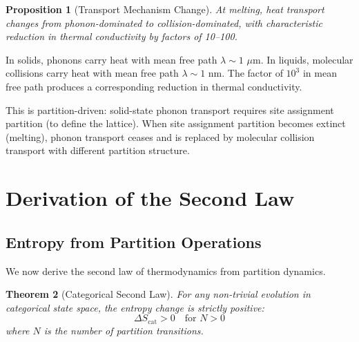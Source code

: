 \documentclass[twocolumn,10pt,aps,prd,superscriptaddress,nofootinbib]{revtex4-2}
\newtheorem{theorem}{Theorem}[section]
\newtheorem{proposition}[theorem]{Proposition}
\theoremstyle{remark}
\newcommand{\Scat}{S_{\mathrm{cat}}}
\begin{document}
\begin{proposition}[Transport Mechanism Change]
\label{prop:transport_change}
At melting, heat transport changes from phonon-dominated to collision-dominated, with characteristic reduction in thermal conductivity by factors of 10--100.
\end{proposition}

In solids, phonons carry heat with mean free path $\lambda \sim 1$ $\mu$m. In liquids, molecular collisions carry heat with mean free path $\lambda \sim 1$ nm. The factor of $10^3$ in mean free path produces a corresponding reduction in thermal conductivity.

This is partition-driven: solid-state phonon transport requires site assignment partition (to define the lattice). When site assignment partition becomes extinct (melting), phonon transport ceases and is replaced by molecular collision transport with different partition structure.


\section{Derivation of the Second Law}
\label{sec:second_law}

\subsection{Entropy from Partition Operations}

We now derive the second law of thermodynamics from partition dynamics.

\begin{theorem}[Categorical Second Law]
\label{thm:categorical_second_law}
For any non-trivial evolution in categorical state space, the entropy change is strictly positive:
\begin{equation}
\Delta \Scat > 0 \quad \text{for } N > 0
\label{eq:categorical_second_law}
\end{equation}
where $N$ is the number of partition transitions.
\end{theorem}
\end{document}
